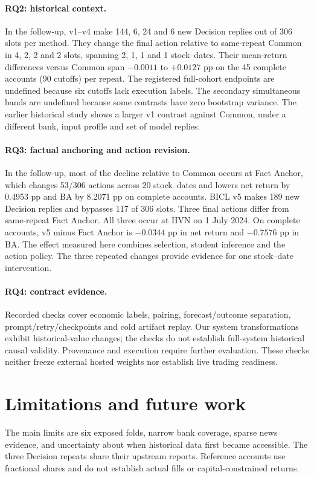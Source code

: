 \paragraph{RQ2: historical context.}
In the follow-up, v1--v4 make 144, 6, 24 and 6 new Decision replies
out of 306 slots per method. They change the final action relative to
same-repeat Common in 4, 2, 2 and 2 slots, spanning 2, 1, 1 and 1
stock--dates. Their mean-return differences versus Common span
$-0.0011$ to $+0.0127$ pp on the 45 complete accounts (90 cutoffs)
per repeat. The registered full-cohort endpoints are undefined because
six cutoffs lack execution labels. The secondary simultaneous bands
are undefined because some contrasts have zero bootstrap variance.
The earlier historical study shows a larger v1 contrast against Common,
under a different bank, input profile and set of model replies.

\paragraph{RQ3: factual anchoring and action revision.}
In the follow-up, most of the decline relative to Common occurs at Fact
Anchor, which changes 53/306 actions across 20 stock--dates and lowers
net return by 0.4953 pp and BA by 8.2071 pp on complete accounts.
BICL v5 makes 189 new Decision replies and bypasses 117
of 306 slots. Three final actions differ from same-repeat Fact Anchor.
All three occur at HVN on 1 July 2024. On complete accounts, v5 minus
Fact Anchor is $-0.0344$ pp in net return and $-0.7576$ pp in BA.
The effect measured here combines selection, student inference and
the action policy. The three repeated changes provide evidence for one
stock--date intervention.

\paragraph{RQ4: contract evidence.}
Recorded checks cover economic labels, pairing, forecast/outcome
separation, prompt/retry/checkpoints and cold artifact replay.
Our system transformations exhibit historical-value changes;
the checks do not establish full-system historical causal validity.
Provenance and execution require further evaluation. These checks neither
freeze external hosted weights nor establish live trading readiness.

\section{Limitations and future work}\label{s:ff798c832c8c6036}
The main limits are six exposed folds, narrow bank coverage, sparse news evidence, and uncertainty about when
historical data first became accessible. The three Decision
repeats share their upstream reports. Reference accounts use fractional
shares and do not establish actual fills or capital-constrained returns.

